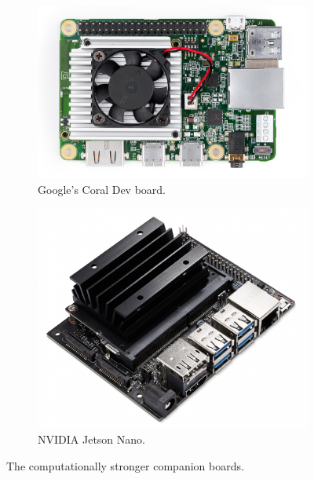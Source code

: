 \begin{itemize}
    \begin{figure}[h!]
        \centering
        \hspace{2cm}
        \begin{subfigure}[b]{0.3\textwidth}
            \centering
            \includegraphics[width=\textwidth]{images/coral_dev.jpg}
            \caption[Google's Coral Dev Board]{Google's Coral Dev board.\footnotemark}
            \label{subfig:coral_dev}
        \end{subfigure}
        \hspace{1cm}
        \begin{subfigure}[b]{0.3\textwidth}
            \centering
            \includegraphics[width=\textwidth]{images/nvidia_jetson_nano.jpg}
        \caption[The NVIDIA Jetson Nano Dev board.]{NVIDIA Jetson Nano.\footnotemark}
        \label{subfig:nvidia_jetson_nano}
        \end{subfigure}
        \caption{The computationally stronger companion boards.}
        \label{fig:companion boards}
    \end{figure}
    


\end{itemize}
